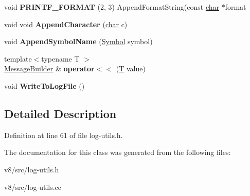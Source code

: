 \begin{DoxyCompactItemize}
\mbox{\label{classv8_1_1internal_1_1Log_1_1MessageBuilder_a6c1062d5130c85438dfa2f3745c6495f}} 
void {\bfseries P\+R\+I\+N\+T\+F\+\_\+\+F\+O\+R\+M\+AT} (2, 3) Append\+Format\+String(const \mbox{\hyperlink{classchar}{char}} $\ast$format
\item 
\mbox{\label{classv8_1_1internal_1_1Log_1_1MessageBuilder_a287f9ebe601a276918f08b398858debd}} 
void void {\bfseries Append\+Character} (\mbox{\hyperlink{classchar}{char}} c)
\item 
\mbox{\label{classv8_1_1internal_1_1Log_1_1MessageBuilder_a8c64f9fa502c17c4fd391c3890e18eeb}} 
void {\bfseries Append\+Symbol\+Name} (\mbox{\hyperlink{classv8_1_1internal_1_1Symbol}{Symbol}} symbol)
\item 
\mbox{\label{classv8_1_1internal_1_1Log_1_1MessageBuilder_af8413738cd4e1ce2478596e38effccc4}} 
{\footnotesize template$<$typename T $>$ }\\\mbox{\hyperlink{classv8_1_1internal_1_1Log_1_1MessageBuilder}{Message\+Builder}} \& {\bfseries operator$<$$<$} (\mbox{\hyperlink{classv8_1_1internal_1_1torque_1_1T}{T}} value)
\item 
\mbox{\label{classv8_1_1internal_1_1Log_1_1MessageBuilder_a1d42878815a65c5681b34b4c439dd652}} 
void {\bfseries Write\+To\+Log\+File} ()
\end{DoxyCompactItemize}


\subsection{Detailed Description}


Definition at line 61 of file log-\/utils.\+h.



The documentation for this class was generated from the following files\+:\begin{DoxyCompactItemize}
\item 
v8/src/log-\/utils.\+h\item 
v8/src/log-\/utils.\+cc\end{DoxyCompactItemize}
